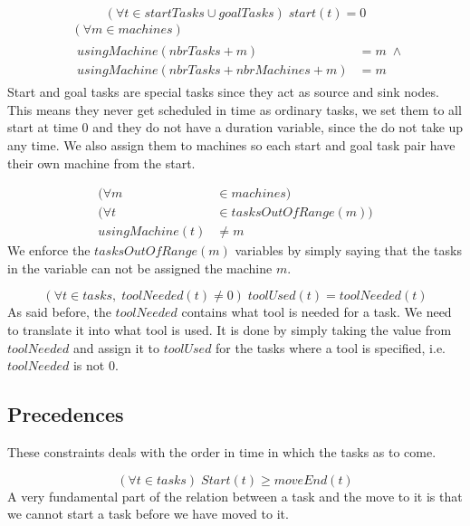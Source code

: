  \begin{equation}\label{eq:93}
 (\forall t \in startTasks \cup goalTasks) \; start(t) = 0
 \end{equation}
 \begin{equation}
 \begin{aligned}\label{eq:94}
 &(\forall m \in machines) \\
 &\begin{aligned}
 usingMachine(nbrTasks + m) &= m \; \land\\
 usingMachine(nbrTasks + nbrMachines + m) &= m
 \end{aligned}
 \end{aligned}
 \end{equation}
 Start and goal tasks are special tasks since they act as source and sink nodes. This means they never get scheduled in time as ordinary tasks, we set them to all start at time $0$ and they do not have a duration variable, since the do not take up any time. We also assign them to machines so each start and goal task pair have their own machine from the start.
 
 \begin{equation}\label{eq:95}
 \begin{aligned}
 (\forall m &\in machines) \\
 (\forall t &\in tasksOutOfRange(m)) \\
 usingMachine(t) &\neq m
 \end{aligned}
 \end{equation}
We enforce the $tasksOutOfRange(m)$ variables by simply saying that the tasks in the variable can not be assigned the machine $m$.

 \begin{equation}\label{eq:117}
 (\forall t \in tasks, \; toolNeeded(t) \neq 0) \; toolUsed(t) = toolNeeded(t)
 \end{equation}
 As said before, the $toolNeeded$ contains what tool is needed for a task. We need to translate it into what tool is used. It is done by simply taking the value from $toolNeeded$ and assign it to $toolUsed$ for the tasks where a tool is specified, i.e. $toolNeeded$ is not $0$.
 
 \subsection{Precedences}
 These constraints deals with the order in time in which the tasks as to come.
 
  \begin{equation}\label{eq:107}
  (\forall t \in tasks) \; Start(t) \geq moveEnd(t)
  \end{equation}
A very fundamental part of the relation between a task and the move to it is that we cannot start a task before we have moved to it.
 
